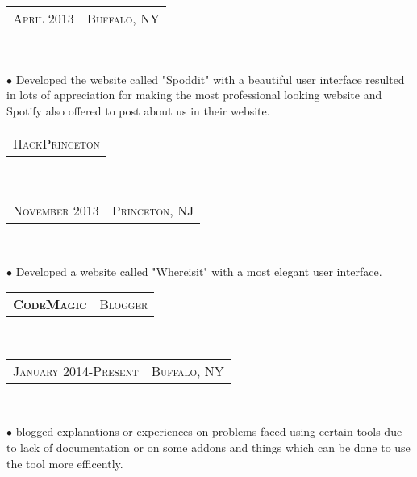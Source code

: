 \documentclass[10pt,a4paper,oneside]{article}
\begin{document}
\begin{minipage}[t]{0.33\textwidth}
{\begin{tabular}{c|c}
                {\small A\textsc{pril 2013}}
                &{\small B\textsc{uffalo}, NY}
            \end{tabular}
        }\\
        \vspace{-12pt}
        \begin{adjustwidth}{7pt}{0pt}
            {\footnotesize  $\bullet$ Developed the website called "Spoddit" with a beautiful user interface resulted in lots of appreciation for 
            making the most professional looking website and Spotify also  offered to post about us in their website.}\\
        \end{adjustwidth}
        \vspace{-6pt}
        \begin{tabular}{c}
            {\small H\textsc{ack}P\textsc{rinceton}}
        \end{tabular}\\
        \textcolor{light-gray}{
            \begin{tabular}{c|c}
                {\small N\textsc{ovember 2013}}
                &{\small P\textsc{rinceton}, NJ}
            \end{tabular}
        }\\
        \vspace{-12pt}
        \begin{adjustwidth}{7pt}{0pt}
            {\footnotesize $\bullet$ Developed a website called "Whereisit" with a most elegant user interface.}\\
        \end{adjustwidth}
        \begin{tabular}{c|c}
            \textbf{\normalsize C\textsc{ode}M\textsc{agic}}
            &\textmd{\normalsize B\textsc{logger}}
        \end{tabular}\\
        \textcolor{light-gray}{
            \begin{tabular}{c|c}
                {\small J\textsc{anuary 2014}-P\textsc{resent}}
                &{\small B\textsc{uffalo}, NY}
            \end{tabular}
        }\\ 
        \vspace{-4mm}
        \begin{adjustwidth}{7pt}{0pt}
            {\footnotesize $\bullet$ blogged explanations or experiences on problems faced using certain tools due to lack
            of documentation or on some addons and things which can be done to use the tool more efficently.}\\

\end{adjustwidth}
\end{minipage}
\end{document}
